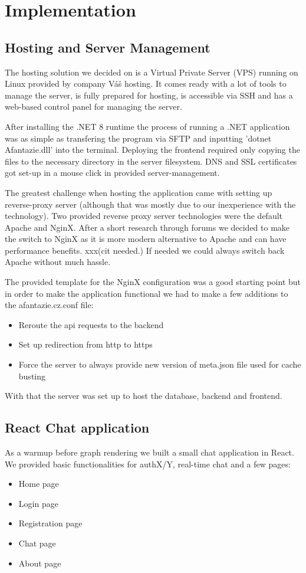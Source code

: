 \chapter{Implementation}

\section{Hosting and Server Management}
The hosting solution we decided on is a Virtual Private Server (VPS) running on Linux provided by company Váš hosting.
It comes ready with a lot of tools to manage the server, is fully prepared for hosting,
is accessible via SSH and has a web-based control panel for managing the server.

After installing the .NET 8 runtime the process of running a .NET application was as simple as transfering the program via SFTP
and inputting 'dotnet Afantazie.dll' into the terminal.
Deploying the frontend required only copying the files to the necessary directory in the server filesystem.
DNS and SSL certificates got set-up in a mouse click in provided server-management.

The greatest challenge when hosting the application came with setting up reverse-proxy server (although that was mostly due to our inexperience with the technology).
Two provided reverse proxy server technologies were the default Apache and NginX.
After a short research through forums we decided to make the switch to NginX as it is more modern alternative to Apache and can have performance benefits. xxx{(cit needed.)}
If needed we could always switch back Apache without much hassle.

The provided template for the NginX configuration was a good starting point but in order to make the
application functional we had to make a few additions to the afantazie.cz.conf file:
\begin{itemize}
    \item Reroute the api requests to the backend
    \item Set up redirection from http to https
    \item Force the server to always provide new version of meta.json file used for cache busting 
\end{itemize}

With that the server was set up to host the database, backend and frontend.

\section{React Chat application}
As a warmup before graph rendering we built a small chat application in React.
We provided basic functionalities for authX/Y, real-time chat and a few pages:
\begin{itemize}
    \item Home page
    \item Login page
    \item Registration page
    \item Chat page
    \item About page
\end{itemize}

